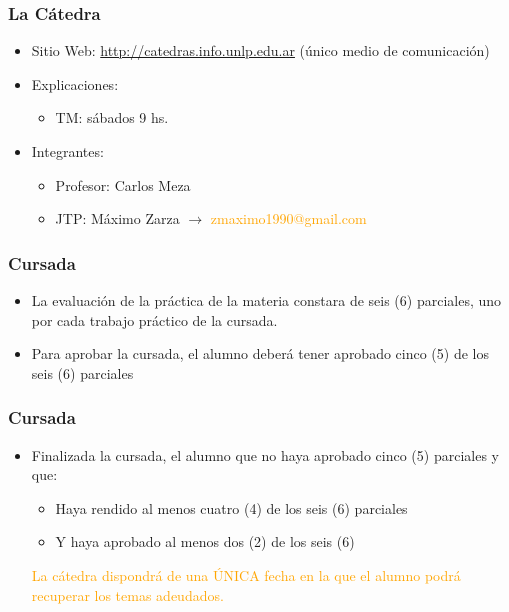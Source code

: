 \begin{frame}
  \frametitle{La Cátedra}
  \begin{itemize}
	  \item Sitio Web: \textcolor{orange}{\url{http://catedras.info.unlp.edu.ar}} (único medio de comunicación)
	  \item Explicaciones:
	  \begin{itemize}
	  	\item TM: sábados 9 hs.
	  \end{itemize}
	  \item Integrantes:
	  \begin{itemize}
	  	\item Profesor: Carlos Meza
	  	\item JTP: Máximo Zarza $\rightarrow$ \textcolor{orange}{zmaximo1990@gmail.com}
	  \end{itemize}
  \end{itemize}
\end{frame}

\begin{frame}
  \frametitle{Cursada}
  \begin{itemize}
	  \item La evaluación de la práctica de la materia constara de seis (6) parciales, uno por cada trabajo práctico de la cursada.
	  \item Para aprobar la cursada, el alumno deberá tener aprobado cinco (5) de los seis (6) parciales
  \end{itemize}
\end{frame}

\begin{frame}
  \frametitle{Cursada}
  \begin{itemize}
	  \item Finalizada la cursada, el alumno que no haya aprobado cinco (5) parciales y que:
	  \begin{itemize}
	  	\item Haya rendido al menos cuatro (4) de los seis (6) parciales
	  	\item Y haya aprobado al menos dos (2) de los seis (6)
	  \end{itemize}
	  
	  \pause
	  \textcolor{orange}{La cátedra dispondrá de una ÚNICA fecha en la que el alumno podrá recuperar los temas adeudados.}
  \end{itemize}
\end{frame}

